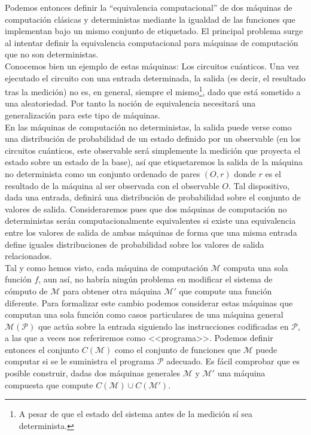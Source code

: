 Podemos entonces definir la ``equivalencia computacional'' de dos máquinas de computación clásicas y deterministas mediante la igualdad de las funciones que implementan bajo un mismo conjunto de etiquetado. El principal problema surge al intentar definir la equivalencia computacional para máquinas de computación que no son deterministas. \\

Conocemos bien un ejemplo de estas máquinas: Los circuitos cuánticos. Una vez ejecutado el circuito con una entrada determinada, la salida (es decir, el resultado tras la medición) no es, en general, siempre el mismo\footnote{A pesar de que el estado del sistema antes de la medición sí sea determinista.}, dado que está sometido a una aleatoriedad. Por tanto la noción de equivalencia necesitará una generalización para este tipo de máquinas.\\

En las máquinas de computación no deterministas, la salida puede verse como una distribución de probabilidad de un estado definido por un observable (en los circuitos cuánticos, este observable será simplemente la medición que proyecta el estado sobre un estado de la base), así que etiquetaremos la salida de la máquina no determinista como un conjunto ordenado de pares $(O, r)$ donde $r$ es el resultado de la máquina al ser observada con el observable $O$. Tal dispositivo, dada una entrada, definirá una distribución de probabilidad sobre el conjunto de valores de salida. Consideraremos pues que dos máquinas de computación no deterministas serán computacionalmente equivalentes si existe una equivalencia entre los valores de salida de ambas máquinas de forma que una misma entrada define iguales distribuciones de probabilidad sobre los valores de salida relacionados.\\

Tal y como hemos visto, cada máquina de computación $\mathcal{M}$ computa una sola función $f$, aun así, no habría ningún problema en modificar el sistema de cómputo de $\mathcal{M}$ para obtener otra máquina $\mathcal{M}'$ que compute una función diferente. Para formalizar este cambio podemos considerar estas máquinas que computan una sola función como casos particulares de una máquina general $\mathcal{M}(\mathcal{P})$ que actúa sobre la entrada siguiendo las instrucciones codificadas en $\mathcal{P}$, a las que a veces nos referiremos como <<programa>>. Podemos definir entonces el conjunto $C(\mathcal{M})$ como el conjunto de funciones que $\mathcal{M}$ puede computar si se le suministra el programa $\mathcal{P}$ adecuado. Es fácil comprobar que es posible construir, dadas dos máquinas generales $\mathcal{M}$ y $\mathcal{M}'$ una máquina compuesta que compute $C(\mathcal{M})\cup C(\mathcal{M}')$.\\

